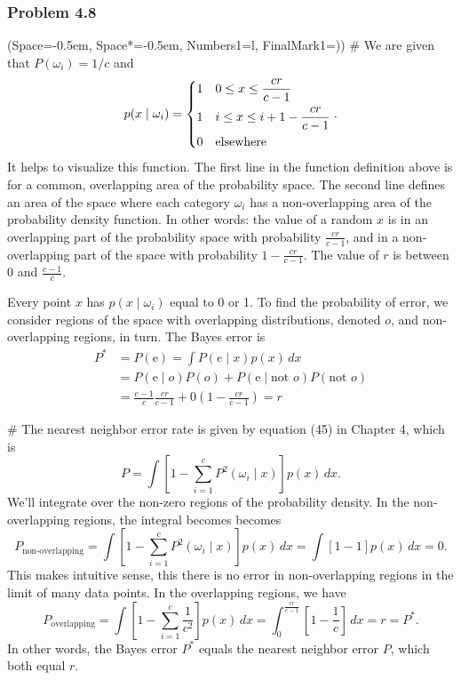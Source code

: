 \documentclass[12pt, a4paper]{article}
\newcommand{\listSpace}{-0.5em}%
\begin{document}
\subsubsection*{Problem 4.8}
\begin{easylist}[enumerate]
\ListProperties(Space=\listSpace, Space*=\listSpace, Numbers1=l, FinalMark1={)})
# We are given that $P(\omega_i) = 1 / c$ and 
\begin{equation*}
	p(x \mid \omega_i) = 
	\begin{dcases}
	1 & 0 \leq x \leq \frac{cr}{c-1} \\
	1 & i \leq x \leq i + 1 - \frac{cr}{c-1} \\
	0 & \text{elsewhere}
	\end{dcases}.
\end{equation*}
It helps to visualize this function.
The first line in the function definition above is for a common, overlapping area of the probability space.
The second line defines an area of the space where each category $\omega_i$ has a non-overlapping area of the probability density function.
In other words: the value of a random $x$ is in an overlapping part of the probability space with probability $\frac{cr}{c-1}$, and in a non-overlapping part of the space with probability $1 - \frac{cr}{c-1}$.
The value of $r$ is between $0$ and $\frac{c-1}{c}$.

Every point $x$ has $p(x \mid \omega_i)$ equal to 0 or 1.
To find the probability of error, we consider regions of the space with overlapping distributions, denoted $o$, and non-overlapping regions, in turn.
The Bayes error is 
\begin{align*}
	P^* &= P (\text{e})  = \int P(e \mid x) p(x) \, dx \\
	&=P (\text{e} \mid o) P (o) +
	 P (\text{e} \mid \text{not } o) P (\text{not } o ) \\
	 &= \frac{c-1}{c} \frac{cr}{c-1}  +
	 0  \left(1 - \frac{cr}{c-1} \right) = r
\end{align*}

# The nearest neighbor error rate is given by equation (45) in Chapter 4, which is 
\begin{equation*}
	P = \int \left[1 - \sum_{i=1}^{c} P^2\left( \omega_i \mid x \right) \right]
	p(x) \, dx.
\end{equation*}
We'll integrate over the non-zero regions of the probability density.
In the non-overlapping regions, the integral becomes becomes
\begin{equation*}
	P_\text{non-overlapping} = \int \left[1 - \sum_{i=1}^{c} P^2\left( \omega_i \mid x \right) \right] p(x) \, dx
	= \int \left[1 - 1 \right]
	p(x) \, dx = 0.
\end{equation*}
This makes intuitive sense, this there is no error in non-overlapping regions in the limit of many data points.
In the overlapping regions, we have
\begin{equation*}
P_\text{overlapping}
= \int \left[1 - \sum_{i=1}^{c} \frac{1}{c^2} \right] p(x) \, dx
= \int_{0}^{\frac{cr}{c-1}} \left[1 - \frac{1}{c} \right] \, dx = r = P^*.
\end{equation*}
In other words, the Bayes error $P^*$ equals the nearest neighbor error $P$, which both equal $r$.


\end{easylist}
\end{document}

